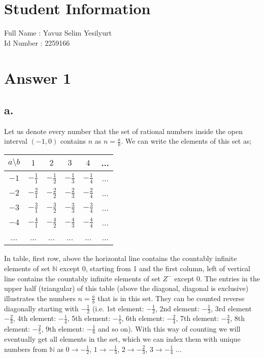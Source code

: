 \documentclass[12pt]{article}
\begin{document}
\section*{Student Information } 
Full Name : Yavuz Selim Yesilyurt \\
Id Number : 2259166 \\

\section*{Answer 1}

\subsection*{a.}
\hspace{6mm}	
Let us denote every number that the set of rational numbers inside the open interval $(-1,0)$ contains $n$ as $n = \frac{a}{b}.$ We can write the elements of this set as;
\begin{center}
\begin{tabular}{ c| c c c c c}
 $a \setminus b$  &$ 1$ & $2$ & $3$ & $4$ & ...  \\
   \hline
 $ -1$ & $-\frac{1}{1}$ & $-\frac{1}{2}$ & $-\frac{1}{3}$ & $-\frac{1}{4}$ & ...\\
 $ -2$ & $-\frac{2}{1}$ & $-\frac{2}{2}$ & $-\frac{2}{3}$ & $-\frac{2}{4}$ & ...\\
 $ -3$ & $-\frac{3}{1}$ & $-\frac{3}{2}$ & $-\frac{3}{3}$ & $-\frac{3}{4}$ & ...\\
 $ -4$ & $-\frac{4}{1}$ & $-\frac{4}{2}$ & $-\frac{4}{3}$ & $-\frac{4}{4}$ & ...\\
 ... & ... & ... & ... & ... & ...\\
\end{tabular}
\end{center}

In table, first row, above the horizontal line contains the countably infinite elements of set $\mathbb{N}$ except $0$, starting from 1 and the first column, left of vertical line contains the countably infinite elements of set $Z^-$ except $0$. The entries in the upper half (triangular) of this table (above the diagonal, diagonal is exclusive) illustrates the numbers $n = \frac{a}{b}$ that is in this set. They can be counted reverse diagonally starting with $-\frac{1}{2}$ (i.e. 1st element: $-\frac{1}{2}$, 2nd element: $-\frac{1}{3}$, 3rd element $-\frac{2}{3}$, 4th element: $-\frac{1}{4}$, 5th element: $-\frac{1}{5}$, 6th element: $-\frac{2}{4}$, 7th element: $-\frac{3}{4}$, 8th element: $-\frac{2}{5}$, 9th element: $-\frac{1}{6}$ and so on). With this way of counting we will eventually get all elements in the set, which we can index them with unique numbers from $\mathbb{N}$ as $0 \rightarrow -\frac{1}{2}$, $1 \rightarrow -\frac{1}{3}$, $2 \rightarrow -\frac{2}{3}$, $3 \rightarrow -\frac{1}{4}$ ...
\end{document}
